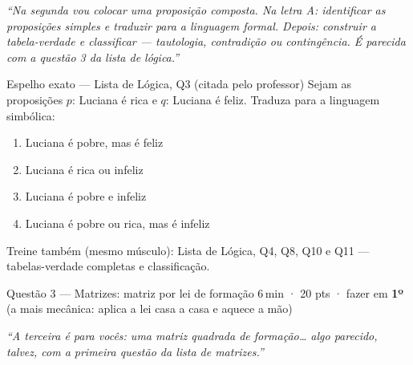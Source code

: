 \documentclass[11pt]{article}
\newcommand{\meta}[1]{{\small\color{inkgray}#1}}
\begin{document}
\begin{profquote}
\small\itshape ``Na segunda vou colocar uma proposição composta. Na letra A: identificar as proposições simples e traduzir para a linguagem formal. Depois: construir a tabela-verdade e classificar — tautologia, contradição ou contingência. É parecida com a questão 3 da lista de lógica.''
\end{profquote}

\begin{espelhobox}{Espelho exato — Lista de Lógica, Q3 (citada pelo professor)}
Sejam as proposições $p$: Luciana é rica \quad e \quad $q$: Luciana é feliz.
Traduza para a linguagem simbólica:
\begin{enumerate}[label=\alph*), leftmargin=2em]
  \item Luciana é pobre, mas é feliz
  \item Luciana é rica ou infeliz
  \item Luciana é pobre e infeliz
  \item Luciana é pobre ou rica, mas é infeliz
\end{enumerate}
\end{espelhobox}

\meta{Treine também (mesmo músculo): Lista de Lógica, Q4, Q8, Q10 e Q11 — tabelas-verdade completas e classificação.}

\begin{questaobox}{Questão 3 — Matrizes: matriz por lei de formação}
\meta{6\,min · 20 pts · fazer em \textbf{1º} (a mais mecânica: aplica a lei casa a casa e aquece a mão)}
\end{questaobox}

\begin{profquote}
\small\itshape ``A terceira é para vocês: uma matriz quadrada de formação\ldots{} algo parecido, talvez, com a primeira questão da lista de matrizes.''
\end{profquote}
\end{document}

